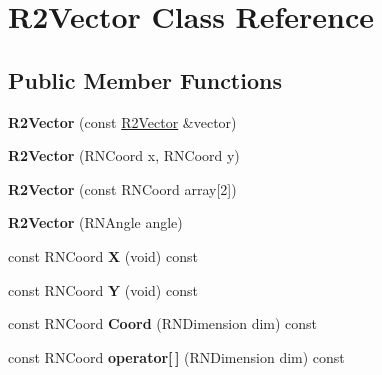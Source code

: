 \hypertarget{class_r2_vector}{}\section{R2\+Vector Class Reference}
\label{class_r2_vector}
\subsection*{Public Member Functions}
\begin{DoxyCompactItemize}
\item 
{\bfseries R2\+Vector} (const \hyperlink{class_r2_vector}{R2\+Vector} \&vector)\hypertarget{class_r2_vector_ada6a42ce5c022332c0674da5f6f20a2c}{}\label{class_r2_vector_ada6a42ce5c022332c0674da5f6f20a2c}

\item 
{\bfseries R2\+Vector} (R\+N\+Coord x, R\+N\+Coord y)\hypertarget{class_r2_vector_a138e7ca86d26ec80dd19a7624ac3d63b}{}\label{class_r2_vector_a138e7ca86d26ec80dd19a7624ac3d63b}

\item 
{\bfseries R2\+Vector} (const R\+N\+Coord array\mbox{[}2\mbox{]})\hypertarget{class_r2_vector_abc3804c917b81b6d5f09a0da2cb0e28c}{}\label{class_r2_vector_abc3804c917b81b6d5f09a0da2cb0e28c}

\item 
{\bfseries R2\+Vector} (R\+N\+Angle angle)\hypertarget{class_r2_vector_a9f34915d0490da4a1df816b5cddc4b4e}{}\label{class_r2_vector_a9f34915d0490da4a1df816b5cddc4b4e}

\item 
const R\+N\+Coord {\bfseries X} (void) const \hypertarget{class_r2_vector_a5deccbf33352b96658a3e345ff14f8b6}{}\label{class_r2_vector_a5deccbf33352b96658a3e345ff14f8b6}

\item 
const R\+N\+Coord {\bfseries Y} (void) const \hypertarget{class_r2_vector_a4705367026d4c2175135de603e994062}{}\label{class_r2_vector_a4705367026d4c2175135de603e994062}

\item 
const R\+N\+Coord {\bfseries Coord} (R\+N\+Dimension dim) const \hypertarget{class_r2_vector_ab732cc7f541273f464fdeae77896f6d3}{}\label{class_r2_vector_ab732cc7f541273f464fdeae77896f6d3}

\item 
const R\+N\+Coord {\bfseries operator\mbox{[}$\,$\mbox{]}} (R\+N\+Dimension dim) const \hypertarget{class_r2_vector_a0dc6bebe700e66508d899d5ba5f23fee}{}\label{class_r2_vector_a0dc6bebe700e66508d899d5ba5f23fee}


\end{DoxyCompactItemize}
